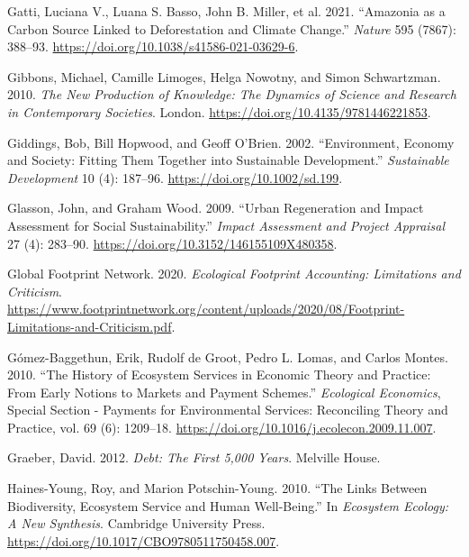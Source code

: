 \documentclass[
  a4paper,
  DIV=11,
  numbers=noendperiod,
  oneside,
  openany]{scrreprt}
\newlength{\cslhangindent}
\newenvironment{CSLReferences}[2] %
 {\begin{list}{}{%
  \setlength{\itemindent}{0pt}
  \setlength{\leftmargin}{0pt}
  \setlength{\parsep}{0pt}
  \ifodd #1
   \setlength{\leftmargin}{\cslhangindent}
   \setlength{\itemindent}{-1\cslhangindent}
  \fi
  \setlength{\itemsep}{#2\baselineskip}}}
 {\end{list}}
\begin{document}
\begin{CSLReferences}{1}{1}
Gatti, Luciana V., Luana S. Basso, John B. Miller, et al. 2021.
{``Amazonia as a Carbon Source Linked to Deforestation and Climate
Change.''} \emph{Nature} 595 (7867): 388--93.
\url{https://doi.org/10.1038/s41586-021-03629-6}.

Gibbons, Michael, Camille Limoges, Helga Nowotny, and Simon Schwartzman.
2010. \emph{The {New} {Production} of {Knowledge}: {The} {Dynamics} of
{Science} and {Research} in {Contemporary} {Societies}}. London.
\url{https://doi.org/10.4135/9781446221853}.

Giddings, Bob, Bill Hopwood, and Geoff O'Brien. 2002. {``Environment,
Economy and Society: Fitting Them Together into Sustainable
Development.''} \emph{Sustainable Development} 10 (4): 187--96.
\url{https://doi.org/10.1002/sd.199}.

Glasson, John, and Graham Wood. 2009. {``Urban Regeneration and Impact
Assessment for Social Sustainability.''} \emph{Impact Assessment and
Project Appraisal} 27 (4): 283--90.
\url{https://doi.org/10.3152/146155109X480358}.

Global Footprint Network. 2020. \emph{Ecological {Footprint}
{Accounting}: {Limitations} and {Criticism}}.
\url{https://www.footprintnetwork.org/content/uploads/2020/08/Footprint-Limitations-and-Criticism.pdf}.

{Gómez-Baggethun, Erik, Rudolf de Groot, Pedro L. Lomas, and Carlos
Montes}. 2010. {``The History of Ecosystem Services in Economic Theory
and Practice: {From} Early Notions to Markets and Payment Schemes.''}
\emph{Ecological Economics}, Special {Section} - {Payments} for
{Environmental Services}: {Reconciling Theory} and {Practice}, vol. 69
(6): 1209--18. \url{https://doi.org/10.1016/j.ecolecon.2009.11.007}.

Graeber, David. 2012. \emph{Debt: The First 5,000 Years}. Melville
House.

Haines-Young, Roy, and Marion Potschin-Young. 2010. {``The Links Between
Biodiversity, Ecosystem Service and Human Well-Being.''} In
\emph{Ecosystem {Ecology}: {A New Synthesis}}. Cambridge University
Press. \url{https://doi.org/10.1017/CBO9780511750458.007}.


\end{CSLReferences}
\end{document}
